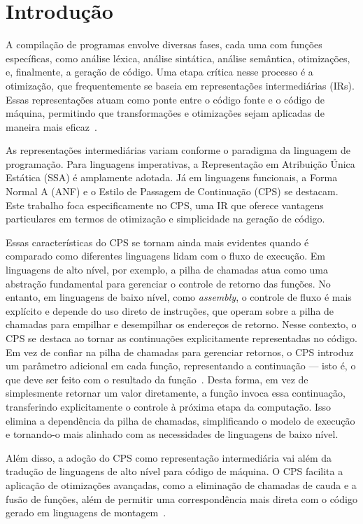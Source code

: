 \chapter{Introdução}\label{sec:introducao}

A compilação de programas envolve diversas fases, cada uma com funções específicas, como análise léxica, análise sintática, análise semântica, otimizações, e, finalmente, a geração de código.
Uma etapa crítica nesse processo é a otimização, que frequentemente se baseia em representações intermediárias (IRs).
Essas representações atuam como ponte entre o código fonte e o código de máquina, permitindo que transformações e otimizações sejam aplicadas de maneira mais eficaz~\cite{plotkin1975call}.

As representações intermediárias variam conforme o paradigma da linguagem de programação.
Para linguagens imperativas, a Representação em Atribuição Única Estática (SSA) é amplamente adotada.
Já em linguagens funcionais, a Forma Normal A (ANF) e o Estilo de Passagem de Continuação (CPS) se destacam.
Este trabalho foca especificamente no CPS, uma IR que oferece vantagens particulares em termos de otimização e simplicidade na geração de código.

Essas características do CPS se tornam ainda mais evidentes quando é comparado como diferentes linguagens lidam com o fluxo de execução.
Em linguagens de alto nível, por exemplo, a pilha de chamadas atua como uma abstração fundamental para gerenciar o controle de retorno das funções.
No entanto, em linguagens de baixo nível, como \textit{assembly}, o controle de fluxo é mais explícito e depende do uso direto de instruções, que operam sobre a pilha de chamadas para empilhar e desempilhar os endereços de retorno.
Nesse contexto, o CPS se destaca ao tornar as continuações explicitamente representadas no código.
Em vez de confiar na pilha de chamadas para gerenciar retornos, o CPS introduz um parâmetro adicional em cada função, representando a continuação — isto é, o que deve ser feito com o resultado da função~\cite{kennedy2007continuations}.
Desta forma, em vez de simplesmente retornar um valor diretamente, a função invoca essa continuação, transferindo explicitamente o controle à próxima etapa da computação.
Isso elimina a dependência da pilha de chamadas, simplificando o modelo de execução e tornando-o mais alinhado com as necessidades de linguagens de baixo nível.

Além disso, a adoção do CPS como representação intermediária vai além da tradução de linguagens de alto nível para código de máquina.
O CPS facilita a aplicação de otimizações avançadas, como a eliminação de chamadas de cauda e a fusão de funções, além de permitir uma correspondência mais direta com o código gerado em linguagens de montagem~\cite{flanagan1993essence}.

